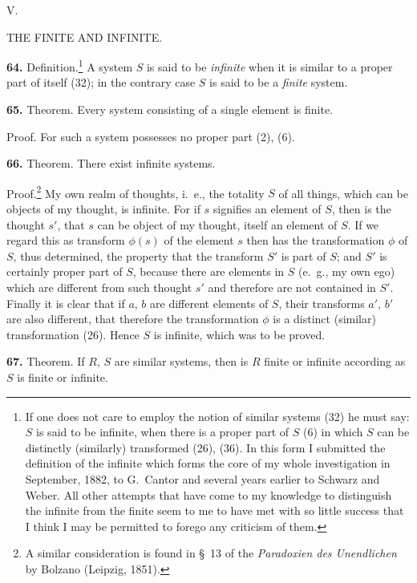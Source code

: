\documentclass[oneside]{book}
\makeatletter
\newcommand\mypara{\medskip\textbf}
\newcommand\mysect[3]{
\medskip\begin{center}{\large #2.}\end{center}
\begin{center}\uppercase{#3.}\end{center}
\addcontentsline{toc}{section}{\protect\phantom{#1}#2\@. #3}
}
\makeatother
\begin{document}

\mysect{XIII}{V}{The Finite and Infinite}

\mypara{64.} Definition.\footnote
  {If one does not care to employ the notion of similar systems (32) he must
say: $S$ is said to be infinite, when there is a proper part of $S$ (6) in which $S$
can be distinctly (similarly) transformed (26), (36). In this form I submitted
the definition of the infinite which forms the core of my whole investigation
in September, 1882, to G.~Cantor and several years earlier to Schwarz and
Weber. All other attempts that have come to my knowledge to distinguish
the infinite from the finite seem to me to have met with so little success that
  I think I may be permitted to forego any criticism of them.}
A system $S$ is said to be \textit{infinite}
when it is similar to a proper part of itself (32); in
the contrary case $S$ is said to be a \textit{finite} system.

\mypara{65.} Theorem. Every system consisting of a single
element is finite.

Proof. For such a system possesses no proper
part (2), (6).


\mypara{66.} Theorem.  There exist infinite systems.

Proof.\footnote
  {A similar consideration is found in §~13 of the \textit{Paradoxien des Unendlichen}
  by Bolzano (Leipzig, 1851).}
My own realm of thoughts, i.~e., the totality
$S$ of all things, which can be objects of my
thought, is infinite. For if $s$ signifies an element of
$S$, then is the thought $s'$, that $s$ can be object of my
thought, itself an element of $S$. If we regard this as
transform $\phi(s)$ of the element $s$ then has the transformation
$\phi$ of $S$, thus determined, the property that the
transform $S'$ is part of $S$; and $S'$ is certainly proper
part of $S$, because there are elements in $S$ (e.~g., my
own ego) which are different from such thought $s'$ and
therefore are not contained in $S'$. Finally it is clear
that if $a$, $b$ are different elements of $S$, their transforms
$a'$, $b'$ are also different, that therefore the transformation
$\phi$ is a distinct (similar) transformation (26).
Hence $S$ is infinite, which was to be proved.

\mypara{67.} Theorem. If $R$, $S$ are similar systems, then is
$R$ finite or infinite according as $S$ is finite or infinite.
\end{document}
